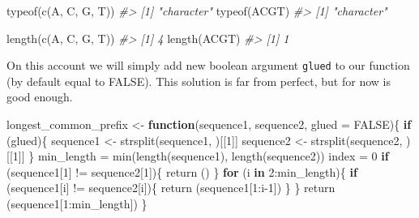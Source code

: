 \documentclass[
]{book}
\newenvironment{Shaded}{\begin{snugshade}}{\end{snugshade}}
\newcommand{\AttributeTok}[1]{\textcolor[rgb]{0.77,0.63,0.00}{#1}}
\newcommand{\CommentTok}[1]{\textcolor[rgb]{0.56,0.35,0.01}{\textit{#1}}}
\newcommand{\ConstantTok}[1]{\textcolor[rgb]{0.00,0.00,0.00}{#1}}
\newcommand{\ControlFlowTok}[1]{\textcolor[rgb]{0.13,0.29,0.53}{\textbf{#1}}}
\newcommand{\DecValTok}[1]{\textcolor[rgb]{0.00,0.00,0.81}{#1}}
\newcommand{\FunctionTok}[1]{\textcolor[rgb]{0.00,0.00,0.00}{#1}}
\newcommand{\NormalTok}[1]{#1}
\newcommand{\OtherTok}[1]{\textcolor[rgb]{0.56,0.35,0.01}{#1}}
\newcommand{\SpecialCharTok}[1]{\textcolor[rgb]{0.00,0.00,0.00}{#1}}
\newcommand{\StringTok}[1]{\textcolor[rgb]{0.31,0.60,0.02}{#1}}
\begin{document}
\begin{Shaded}
\begin{Highlighting}[]
\FunctionTok{typeof}\NormalTok{(}\FunctionTok{c}\NormalTok{(}\StringTok{\textquotesingle{}A\textquotesingle{}}\NormalTok{, }\StringTok{\textquotesingle{}C\textquotesingle{}}\NormalTok{, }\StringTok{\textquotesingle{}G\textquotesingle{}}\NormalTok{, }\StringTok{\textquotesingle{}T\textquotesingle{}}\NormalTok{))}
\CommentTok{\#\textgreater{} [1] "character"}
\FunctionTok{typeof}\NormalTok{(}\StringTok{\textquotesingle{}ACGT\textquotesingle{}}\NormalTok{)}
\CommentTok{\#\textgreater{} [1] "character"}

\FunctionTok{length}\NormalTok{(}\FunctionTok{c}\NormalTok{(}\StringTok{\textquotesingle{}A\textquotesingle{}}\NormalTok{, }\StringTok{\textquotesingle{}C\textquotesingle{}}\NormalTok{, }\StringTok{\textquotesingle{}G\textquotesingle{}}\NormalTok{, }\StringTok{\textquotesingle{}T\textquotesingle{}}\NormalTok{))}
\CommentTok{\#\textgreater{} [1] 4}
\FunctionTok{length}\NormalTok{(}\StringTok{\textquotesingle{}ACGT\textquotesingle{}}\NormalTok{)}
\CommentTok{\#\textgreater{} [1] 1}
\end{Highlighting}
\end{Shaded}

On this account we will simply add new boolean argument \texttt{glued} to our function (by default equal to FALSE). This solution is far from perfect, but for now is good enough.

\begin{Shaded}
\begin{Highlighting}[]
\NormalTok{longest\_common\_prefix }\OtherTok{\textless{}{-}} \ControlFlowTok{function}\NormalTok{(sequence1, sequence2, }\AttributeTok{glued =} \ConstantTok{FALSE}\NormalTok{)\{}
  \ControlFlowTok{if}\NormalTok{ (glued)\{}
\NormalTok{    sequence1 }\OtherTok{\textless{}{-}} \FunctionTok{strsplit}\NormalTok{(sequence1, }\StringTok{\textquotesingle{}\textquotesingle{}}\NormalTok{)[[}\DecValTok{1}\NormalTok{]]}
\NormalTok{    sequence2 }\OtherTok{\textless{}{-}} \FunctionTok{strsplit}\NormalTok{(sequence2, }\StringTok{\textquotesingle{}\textquotesingle{}}\NormalTok{)[[}\DecValTok{1}\NormalTok{]]}
\NormalTok{  \}}
\NormalTok{  min\_length }\OtherTok{=} \FunctionTok{min}\NormalTok{(}\FunctionTok{length}\NormalTok{(sequence1), }\FunctionTok{length}\NormalTok{(sequence2))}
\NormalTok{  index }\OtherTok{=} \DecValTok{0}
  \ControlFlowTok{if}\NormalTok{ (sequence1[}\DecValTok{1}\NormalTok{] }\SpecialCharTok{!=}\NormalTok{ sequence2[}\DecValTok{1}\NormalTok{])\{}
    \FunctionTok{return}\NormalTok{ (}\StringTok{\textquotesingle{}\textquotesingle{}}\NormalTok{)}
\NormalTok{  \}}
  \ControlFlowTok{for}\NormalTok{ (i }\ControlFlowTok{in} \DecValTok{2}\SpecialCharTok{:}\NormalTok{min\_length)\{}
    \ControlFlowTok{if}\NormalTok{ (sequence1[i] }\SpecialCharTok{!=}\NormalTok{ sequence2[i])\{}
      \FunctionTok{return}\NormalTok{ (sequence1[}\DecValTok{1}\SpecialCharTok{:}\NormalTok{i}\DecValTok{{-}1}\NormalTok{])}
\NormalTok{    \}}
\NormalTok{  \}}
  \FunctionTok{return}\NormalTok{ (sequence1[}\DecValTok{1}\SpecialCharTok{:}\NormalTok{min\_length])}
\NormalTok{\}}
\end{Highlighting}
\end{Shaded}
\end{document}
